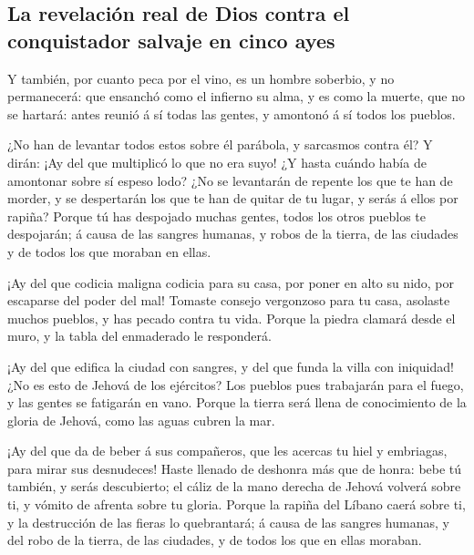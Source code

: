 \hypertarget{la-revelaciuxf3n-real-de-dios-contra-el-conquistador-salvaje-en-cinco-ayes}{%
\subsection{La revelación real de Dios contra el conquistador salvaje en
cinco
ayes}\label{la-revelaciuxf3n-real-de-dios-contra-el-conquistador-salvaje-en-cinco-ayes}}

 Y también, por cuanto peca por el vino, es un hombre
soberbio, y no permanecerá: que ensanchó como el infierno su alma, y es
como la muerte, que no se hartará: antes reunió á sí todas las gentes, y
amontonó á sí todos los pueblos.

 ¿No han de levantar todos estos sobre él parábola, y
sarcasmos contra él? Y dirán: ¡Ay del que multiplicó lo que no era suyo!
¿Y hasta cuándo había de amontonar sobre sí espeso lodo? 
¿No se levantarán de repente los que te han de morder, y se despertarán
los que te han de quitar de tu lugar, y serás á ellos por rapiña?
 Porque tú has despojado muchas gentes, todos los otros
pueblos te despojarán; á causa de las sangres humanas, y robos de la
tierra, de las ciudades y de todos los que moraban en ellas.

 ¡Ay del que codicia maligna codicia para su casa, por poner
en alto su nido, por escaparse del poder del mal!  Tomaste
consejo vergonzoso para tu casa, asolaste muchos pueblos, y has pecado
contra tu vida.  Porque la piedra clamará desde el muro, y
la tabla del enmaderado le responderá.

 ¡Ay del que edifica la ciudad con sangres, y del que funda
la villa con iniquidad!  ¿No es esto de Jehová de los
ejércitos? Los pueblos pues trabajarán para el fuego, y las gentes se
fatigarán en vano.  Porque la tierra será llena de
conocimiento de la gloria de Jehová, como las aguas cubren la mar.

 ¡Ay del que da de beber á sus compañeros, que les acercas
tu hiel y embriagas, para mirar sus desnudeces!  Haste
llenado de deshonra más que de honra: bebe tú también, y serás
descubierto; el cáliz de la mano derecha de Jehová volverá sobre ti, y
vómito de afrenta sobre tu gloria.  Porque la rapiña del
Líbano caerá sobre ti, y la destrucción de las fieras lo quebrantará; á
causa de las sangres humanas, y del robo de la tierra, de las ciudades,
y de todos los que en ellas moraban.

